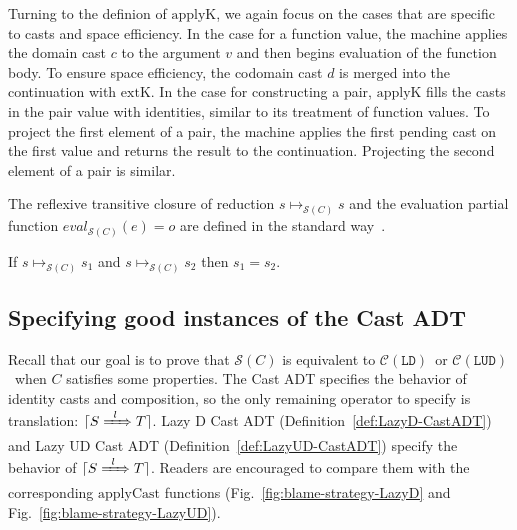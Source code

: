 \documentclass[runningheads]{llncs}
\newcommand{\CMachine}[1]{\ensuremath{\mathcal{C}(#1)}}
\newcommand{\LDMachine}{\CMachine{\BLD}}
\newcommand{\LUDMachine}{\CMachine{\BLUD}}
\newcommand{\SMachine}[1]{\ensuremath{\mathcal{S}(#1)}}
\newcommand{\ccast}[3]{#1 \xRightarrow[]{\enskip #2 \enskip} #3}
\newcommand{\BLD}[0]{\ensuremath{\mathtt{LD}}}
\newcommand{\BLUD}[0]{\ensuremath{\mathtt{LUD}}}
\newcommand{\translate}[1]{\ensuremath{\lceil#1\rceil}}
\newcommand{\applyContName}[0]{\ensuremath{\mathrm{applyK}}}
\newcommand{\reducetoS}[3]{\ensuremath{#2 \longmapsto_{\SMachine{#1}} #3}}
\newcommand{\evaltoS}[3]{\ensuremath{\mathit{eval}_{\SMachine{#1}}(#2)=#3}}
\begin{document}
Turning to the definion of $\applyContName{}$, we again focus on the
cases that are specific to casts and space efficiency.  In the case
for a function value, the machine applies the domain cast $c$ to the
argument $v$ and then begins evaluation of the function body. To
ensure space efficiency, the codomain cast $d$ is merged into the
continuation with $\mathrm{extK}$.
%
In the case for constructing a pair, $\applyContName$ fills the casts
in the pair value with identities, similar to its treatment of
function values.
%
To project the first element of a pair, the machine applies the first
pending cast on the first value and returns the result to the
continuation.
%
Projecting the second element of a pair is similar.

The reflexive transitive closure of reduction $\reducetoS{C}{s}{s}$
and the evaluation partial function $\evaltoS{C}{e}{o}$ are defined in
the standard way~\citep{felleisen03:_pllc}.

\begin{proposition}[\SMachine{C} is deterministic]
	\label{prop:SEMachine-deterministic}
	If $\reducetoS{C}{s}{s_1}$ and $\reducetoS{C}{s}{s_2}$ 
	then $s_1 = s_2$.
\end{proposition}

\subsection{Specifying good instances of the Cast ADT} \label{sec:good-cast-adt}

Recall that our goal is to prove that \SMachine{C} is equivalent to
\LDMachine\ or \LUDMachine\ when $C$ satisfies some properties. The
Cast ADT specifies the behavior of identity casts and composition, so
the only remaining operator to specify is translation:
$\translate{\ccast{S}{l}{T}}$.
%
Lazy D Cast ADT (Definition~\ref{def:LazyD-CastADT}) and Lazy UD Cast ADT 
(Definition~\ref{def:LazyUD-CastADT}) specify the behavior 
of \translate{\ccast{S}{l}{T}}. Readers are encouraged to compare them with the 
corresponding $\mathrm{applyCast}$ functions 
(Fig.~\ref{fig:blame-strategy-LazyD} and 
Fig.~\ref{fig:blame-strategy-LazyUD}).
\end{document}
